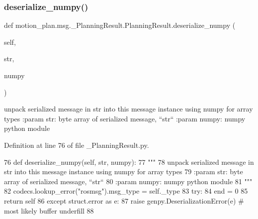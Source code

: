 \subsubsection{\texorpdfstring{deserialize\+\_\+numpy()}{deserialize\_numpy()}}
{\footnotesize\ttfamily def motion\+\_\+plan.\+msg.\+\_\+\+Planning\+Result.\+Planning\+Result.\+deserialize\+\_\+numpy (\begin{DoxyParamCaption}\item[{}]{self,  }\item[{}]{str,  }\item[{}]{numpy }\end{DoxyParamCaption})}

\begin{DoxyVerb}unpack serialized message in str into this message instance using numpy for array types
:param str: byte array of serialized message, ``str``
:param numpy: numpy python module
\end{DoxyVerb}
 

Definition at line 76 of file \+\_\+\+Planning\+Result.\+py.


\begin{DoxyCode}
76   \textcolor{keyword}{def }deserialize\_numpy(self, str, numpy):
77     \textcolor{stringliteral}{"""}
78 \textcolor{stringliteral}{    unpack serialized message in str into this message instance using numpy for array types}
79 \textcolor{stringliteral}{    :param str: byte array of serialized message, ``str``}
80 \textcolor{stringliteral}{    :param numpy: numpy python module}
81 \textcolor{stringliteral}{    """}
82     codecs.lookup\_error(\textcolor{stringliteral}{"rosmsg"}).msg\_type = self.\_type
83     \textcolor{keywordflow}{try}:
84       end = 0
85       \textcolor{keywordflow}{return} self
86     \textcolor{keywordflow}{except} struct.error \textcolor{keyword}{as} e:
87       \textcolor{keywordflow}{raise} genpy.DeserializationError(e)  \textcolor{comment}{# most likely buffer underfill}
88 
\end{DoxyCode}
\mbox{\label{classmotion__plan_1_1msg_1_1__PlanningResult_1_1PlanningResult_a7325dd722c01ea020fee9f389f3e32bc}} 
